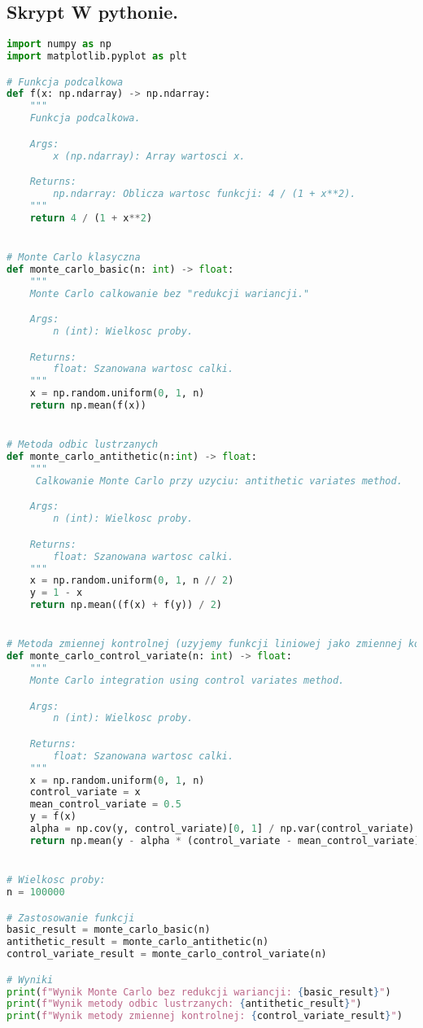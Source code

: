 \documentclass[12pt,letterpaper]{article}
\theoremstyle{definition}
\begin{document}
\subsection{Skrypt W pythonie.}
\begin{lstlisting}[language=Python, caption=Skrypt do Zad 3.]
import numpy as np
import matplotlib.pyplot as plt

# Funkcja podcalkowa
def f(x: np.ndarray) -> np.ndarray:
    """
    Funkcja podcalkowa.

    Args:
        x (np.ndarray): Array wartosci x.

    Returns:
        np.ndarray: Oblicza wartosc funkcji: 4 / (1 + x**2).
    """
    return 4 / (1 + x**2)


# Monte Carlo klasyczna
def monte_carlo_basic(n: int) -> float:
    """
    Monte Carlo calkowanie bez "redukcji wariancji."

    Args:
        n (int): Wielkosc proby.

    Returns:
        float: Szanowana wartosc calki.
    """
    x = np.random.uniform(0, 1, n)
    return np.mean(f(x))


# Metoda odbic lustrzanych
def monte_carlo_antithetic(n:int) -> float:
    """
     Calkowanie Monte Carlo przy uzyciu: antithetic variates method.

    Args:
        n (int): Wielkosc proby.

    Returns:
        float: Szanowana wartosc calki.
    """
    x = np.random.uniform(0, 1, n // 2)
    y = 1 - x
    return np.mean((f(x) + f(y)) / 2)


# Metoda zmiennej kontrolnej (uzyjemy funkcji liniowej jako zmiennej kontrolnej)
def monte_carlo_control_variate(n: int) -> float:
    """
    Monte Carlo integration using control variates method.

    Args:
        n (int): Wielkosc proby.

    Returns:
        float: Szanowana wartosc calki.
    """
    x = np.random.uniform(0, 1, n)
    control_variate = x
    mean_control_variate = 0.5
    y = f(x)
    alpha = np.cov(y, control_variate)[0, 1] / np.var(control_variate)
    return np.mean(y - alpha * (control_variate - mean_control_variate))


# Wielkosc proby:
n = 100000

# Zastosowanie funkcji
basic_result = monte_carlo_basic(n)
antithetic_result = monte_carlo_antithetic(n)
control_variate_result = monte_carlo_control_variate(n)

# Wyniki
print(f"Wynik Monte Carlo bez redukcji wariancji: {basic_result}")
print(f"Wynik metody odbic lustrzanych: {antithetic_result}")
print(f"Wynik metody zmiennej kontrolnej: {control_variate_result}")


\end{lstlisting}
\end{document}
